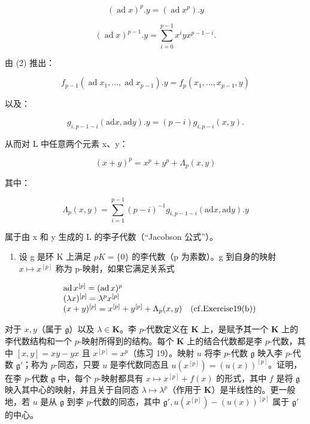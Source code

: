 \[
(\operatorname{ad} x) ^ {p}. y = (\operatorname{ad} x ^ {p}). y\tag{2}
\]

\[
(\operatorname{ad} x) ^ {p - 1}. y = \sum_ {i = 0} ^ {p - 1} x ^ {i} y x ^ {p - 1 - i}.
\]

由 (2) 推出：

\[
f _ {p - 1} (\operatorname{ad} x _ {1}, \dots , \operatorname{ad} x _ {p - 1}). y = f _ {p} (x _ {1}, \dots , x _ {p - 1}, y)
\]

以及：

\[
g _ {i, p - 1 - i} (\mathrm{ad} x, \mathrm{ad} y). y = (p - i) g _ {i, p - i} (x, y).
\]

从而对 L 中任意两个元素 x、y：

\[
(x + y) ^ {p} = x ^ {p} + y ^ {p} + \Lambda_ {p} (x, y)\tag{3}
\]

其中：

\[
\Lambda_ {p} (x, y) = \sum_ {i = 1} ^ {p - 1} (p - i) ^ {- 1} g _ {i, p - 1 - i} (\mathrm{ad} x, \mathrm{ad} y). y
\]

属于由 x 和 y 生成的 L 的李子代数（“Jacobson 公式”）。

\begin{enumerate}
\def\labelenumi{\arabic{enumi}.}
\setcounter{enumi}{19}
\tightlist
\item
  设 g 是环 K 上满足 \(pK = \{0\}\) 的李代数（p 为素数）。g 到自身的映射 \(x \mapsto x^{[p]}\) 称为 p-映射，如果它满足关系式
\end{enumerate}

\[
\begin{array}{r l} & {\operatorname{ad} x ^ {[ p ]} = (\operatorname{ad} x) ^ {p}} \\ & {(\lambda x) ^ {[ p ]} = \lambda^ {p} x ^ {[ p ]}} \\ & {(x + y) ^ {[ p ]} = x ^ {[ p ]} + y ^ {[ p ]} + \Lambda_ {p} (x, y) \quad (\mathrm{cf.Exercise19(b)})} \end{array}
\]

对于 \(x, y\)（属于 \(\mathfrak{g}\)）以及 \(\lambda \in \mathbf{K}\)。李 \(p\)-代数定义在 \(\mathbf{K}\) 上，是赋予其一个 \(\mathbf{K}\) 上的李代数结构和一个 \(p\)-映射所得到的结构。每个 \(\mathbf{K}\) 上的结合代数都是李 \(p\)-代数，其中 \([x, y] = xy - yx\) 且 \(x^{[p]} = x^p\)（练习 19）。映射 \(u\) 将李 \(p\)-代数 \(\mathfrak{g}\) 映入李 \(p\)-代数 \(\mathfrak{g}'\)；称为 \(p\)-同态，只要 \(u\) 是李代数同态且 \(u(x^{[p]}) = (u(x))^{[p]}\)。证明，在李 \(p\)-代数 \(\mathfrak{g}\) 中，每个 \(p\)-映射都具有 \(x \mapsto x^{[p]} + f(x)\) 的形式，其中 \(f\) 是将 \(\mathfrak{g}\) 映入其中心的映射，并且关于自同态 \(\lambda \mapsto \lambda^p\)（作用于 \(\mathbf{K}\)）是半线性的。更一般地，若 \(u\) 是从 \(\mathfrak{g}\) 到李 \(p\)-代数的同态，其中 \(\mathfrak{g}', u(x^{[p]}) - (u(x))^{[p]}\) 属于 \(\mathfrak{g}'\) 的中心。

